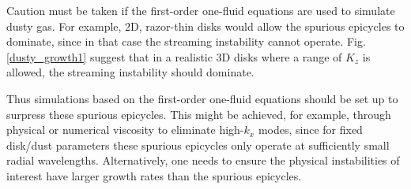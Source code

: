 Caution must be taken if the first-order one-fluid equations are used
to simulate dusty gas. 
For example, 2D, razor-thin disks would allow the spurious epicycles
to dominate, since in that case the streaming instability cannot
operate. Fig. \ref{dusty_growth1} suggest that in a realistic 3D disks
where a range of $K_z$ is allowed, the streaming instability should
dominate. 

Thus simulations based on the first-order one-fluid equations should
be set up to surpress these spurious epicycles. This might be
achieved, for example, through physical or numerical viscosity to
eliminate high-$k_x$ modes, since for fixed disk/dust parameters these
spurious epicycles only operate at sufficiently small radial
wavelengths. Alternatively, one needs to ensure the physical
instabilities of interest have larger growth rates than the spurious
epicycles. 









